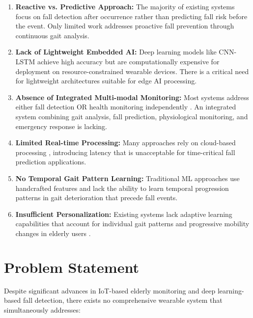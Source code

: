 \documentclass[conference]{IEEEtran}
\begin{document}
\begin{enumerate}
    \item \textbf{Reactive vs. Predictive Approach:} The majority of existing systems \cite{saraubon2018, kumar2024sensor, zhang2025} focus on fall detection after occurrence rather than predicting fall risk before the event. Only limited work addresses proactive fall prevention through continuous gait analysis.
    
    \item \textbf{Lack of Lightweight Embedded AI:} Deep learning models like CNN-LSTM \cite{gaud2025, zhang2025} achieve high accuracy but are computationally expensive for deployment on resource-constrained wearable devices. There is a critical need for lightweight architectures suitable for edge AI processing.
    
    \item \textbf{Absence of Integrated Multi-modal Monitoring:} Most systems address either fall detection OR health monitoring independently \cite{bandara2020, augastiny2023}. An integrated system combining gait analysis, fall prediction, physiological monitoring, and emergency response is lacking.
    
    \item \textbf{Limited Real-time Processing:} Many approaches rely on cloud-based processing \cite{setu2025starlink, pasrija2025}, introducing latency that is unacceptable for time-critical fall prediction applications.
    
    \item \textbf{No Temporal Gait Pattern Learning:} Traditional ML approaches \cite{attal2015, acm2024} use handcrafted features and lack the ability to learn temporal progression patterns in gait deterioration that precede fall events.
    
    \item \textbf{Insufficient Personalization:} Existing systems lack adaptive learning capabilities that account for individual gait patterns and progressive mobility changes in elderly users \cite{khalil2026, vogka2025}.
\end{enumerate}

\section{Problem Statement}

Despite significant advances in IoT-based elderly monitoring and deep learning-based fall detection, there exists no comprehensive wearable system that simultaneously addresses:
\end{document}
